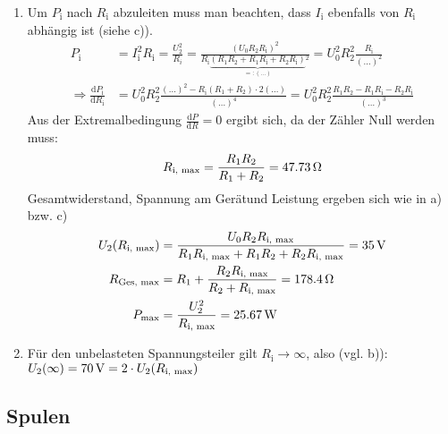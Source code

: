 \documentclass[a4paper]{scrartcl}
\begin{document}
\begin{enumerate}[noitemsep]
\begin{align*}
  \end{align*}
  Die Leistung am Gerät\texttrademark ergibt sich mit $P = I_\text{i}^2R_\text{i} = \unit[22.45]{W}$.
\item Um $P_\text{i}$ nach $R_\text{i}$ abzuleiten muss man beachten, dass $I_\text{i}$ ebenfalls von $R_\text{i}$ abhängig ist (siehe c)).
  \begin{align*}
    P_\text{i} & = I_\text{i}^2R_\text{i} = \frac{U_2^2}{R_i} = \frac{(U_0R_2R_\text{i})^2}{R_\text{i}\underbrace{(R_1R_2+R_1R_\text{i}+R_2R_\text{i})}_{=:(\dots)}{}^2} = U_0^2R_2^2 \frac{R_\text{i}}{(\dots)^2}\\ %
    \Rightarrow \frac{\text{d}P_\text{i}}{\text{d}R_\text{i}} &= U_0^2R_2^2 \frac{(\dots)^2 - R_\text{i}(R_1+R_2) \cdot 2(\dots)}{(\dots)^4} = U_0^2R_2^2 \frac{R_1R_2 - R_1R_\text{i} - R_2R_\text{i}}{(\dots)^3}
  \end{align*}
  Aus der Extremalbedingung $\frac{\text{d}P}{\text{d}R} = 0$ ergibt sich, da der Zähler Null werden muss:
  \begin{align*}
    R_\text{i, max} = \frac{R_1R_2}{R_1+R_2} = \unit[47.73]{\Omega}
  \end{align*}
  Gesamtwiderstand, Spannung am Gerät\texttrademark und Leistung ergeben sich wie in a) bzw. c)
  \begin{align*}
    U_2(R_\text{i, max}) &=  \frac{U_0 R_2 R_\text{i, max}}{R_1R_\text{i, max} + R_1R_2 + R_2R_\text{i, max}} = \unit[35]{V}\\
    R_\text{Ges, max} &=  R_1 + \frac{R_2R_\text{i, max}}{R_2 + R_\text{i, max}} = \unit[178.4]{\Omega}\\
    P_\text{max} &= \frac{U_2^2}{R_\text{i, max}} = \unit[25.67]{W}
  \end{align*}
\item Für den unbelasteten Spannungsteiler gilt $R_\text{i} \to \infty$, also (vgl. b)): $U_2(\infty) = \unit[70]{V} = 2\cdot U_2(R_\text{i, max})$
\end{enumerate}

\subsection{Spulen}
\end{document}
